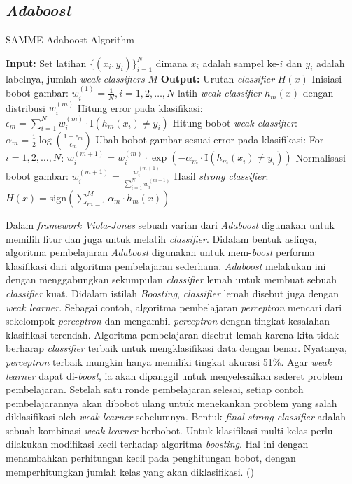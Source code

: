 \subsection{\emph{Adaboost}}

\begin{algorithm}
\caption{SAMME Adaboost Algorithm}
\begin{algorithmic}[1]
\State \textbf{Input:} Set latihan $\{(x_i, y_i)\}_{i=1}^N$ dimana $x_i$ adalah sampel ke-$i$ dan $y_i$ adalah labelnya, jumlah \textit{weak classifiers} $M$
\State \textbf{Output:} Urutan \textit{classifier} $H(x)$
\State Inisiasi bobot gambar: $w_i^{(1)} = \frac{1}{N}, i=1,2,\ldots,N$
    \State latih \textit{weak classifier} $h_m(x)$ dengan distribusi $w_i^{(m)}$
    \State Hitung error pada klasifikasi: $\epsilon_m = \sum_{i=1}^N w_i^{(m)} \cdot \text{I}(h_m(x_i) \neq y_i)$
    \State Hitung bobot \textit{weak classifier}: $\alpha_m = \frac{1}{2} \log\left(\frac{1 - \epsilon_m}{\epsilon_m}\right)$
    \State Ubah bobot gambar sesuai error pada klasifikasi:
    \State \hspace{\algorithmicindent} For $i=1,2,\ldots,N$: $w_i^{(m+1)} = w_i^{(m)} \cdot \exp(-\alpha_m \cdot \text{I}(h_m(x_i) \neq y_i))$
    \State Normalisasi bobot gambar: $w_i^{(m+1)} = \frac{w_i^{(m+1)}}{\sum_{i=1}^N w_i^{(m+1)}}$
\EndFor
\State Hasil \textit{strong classifier}: $H(x) = \text{sign}\left(\sum_{m=1}^M \alpha_m \cdot h_m(x)\right)$
\end{algorithmic}
\end{algorithm}

Dalam \emph{framework Viola-Jones} sebuah varian dari \emph{Adaboost} 
digunakan untuk memilih fitur dan juga untuk melatih \textit{classifier}. 
Didalam bentuk aslinya, algoritma pembelajaran \emph{Adaboost} digunakan 
untuk mem-\textit{boost} performa klasifikasi dari algoritma pembelajaran 
sederhana. \emph{Adaboost} melakukan ini dengan menggabungkan sekumpulan 
\emph{classifier} lemah untuk membuat sebuah \emph{classifier} kuat. 
Didalam istilah \emph{Boosting}, \emph{classifier} lemah disebut juga 
dengan \emph{weak learner}. Sebagai contoh, algoritma pembelajaran \emph{perceptron} 
mencari dari sekelompok \emph{perceptron} dan mengambil \emph{perceptron} 
dengan tingkat kesalahan klasifikasi terendah. Algoritma pembelajaran disebut 
lemah karena kita tidak berharap \emph{classifier} terbaik untuk mengklasifikasi 
data dengan benar. Nyatanya, \emph{perceptron} terbaik mungkin 
hanya memiliki tingkat akurasi 51\%. Agar \emph{weak learner} dapat di-\textit{boost}, 
ia akan dipanggil untuk menyelesaikan sederet problem pembelajaran. Setelah 
satu ronde pembelajaran selesai, setiap contoh pembelajarannya akan dibobot ulang 
untuk menekankan problem yang salah diklasifikasi oleh \emph{weak learner} 
sebelumnya. Bentuk \emph{final strong classifier} adalah 
sebuah kombinasi \emph{weak learner} berbobot. Untuk klasifikasi multi-kelas 
perlu dilakukan modifikasi kecil terhadap algoritma \emph{boosting}. Hal ini dengan menambahkan 
perhitungan kecil pada penghitungan bobot, dengan memperhitungkan jumlah kelas yang akan 
diklasifikasi. (\cite{samme})

